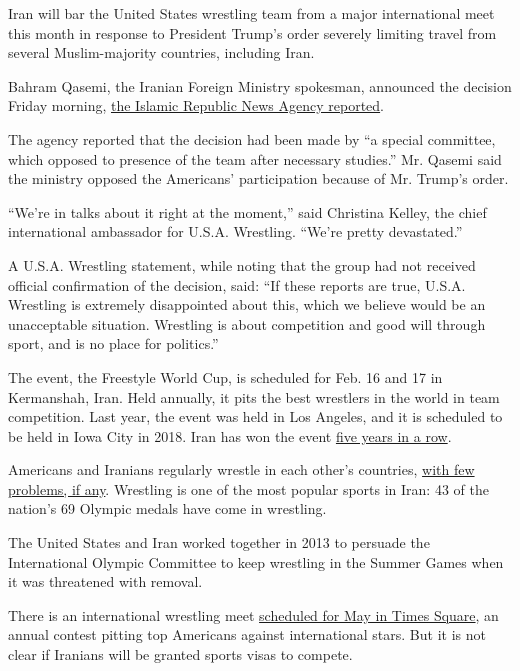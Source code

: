 Iran will bar the United States wrestling team from a major
international meet this month in response to President Trump's order
severely limiting travel from several Muslim-majority countries,
including Iran.

Bahram Qasemi, the Iranian Foreign Ministry spokesman, announced the
decision Friday morning, \href{http://www.irna.ir/en/News/82413890/}{the
Islamic Republic News Agency reported}.

The agency reported that the decision had been made by ``a special
committee, which opposed to presence of the team after necessary
studies.'' Mr. Qasemi said the ministry opposed the Americans'
participation because of Mr. Trump's order.

``We're in talks about it right at the moment,'' said Christina Kelley,
the chief international ambassador for U.S.A. Wrestling. ``We're pretty
devastated.''

A U.S.A. Wrestling statement, while noting that the group had not
received official confirmation of the decision, said: ``If these reports
are true, U.S.A. Wrestling is extremely disappointed about this, which
we believe would be an unacceptable situation. Wrestling is about
competition and good will through sport, and is no place for politics.''

The event, the Freestyle World Cup, is scheduled for Feb. 16 and 17 in
Kermanshah, Iran. Held annually, it pits the best wrestlers in the world
in team competition. Last year, the event was held in Los Angeles, and
it is scheduled to be held in Iowa City in 2018. Iran has won the event
\href{https://unitedworldwrestling.org/article/iran-captures-fifth-straight-freestyle-world-cup-title}{five
years in a row}.

Americans and Iranians regularly wrestle in each other's countries,
\href{https://www.nytimes3xbfgragh.onion/2017/01/28/sports/trump-refugee-ban.html}{with
few problems, if any}. Wrestling is one of the most popular sports in
Iran: 43 of the nation's 69 Olympic medals have come in wrestling.

The United States and Iran worked together in 2013 to persuade the
International Olympic Committee to keep wrestling in the Summer Games
when it was threatened with removal.

There is an international wrestling meet
\href{http://usawevents.sportngin.com/events}{scheduled for May in Times
Square}, an annual contest pitting top Americans against international
stars. But it is not clear if Iranians will be granted sports visas to
compete.

